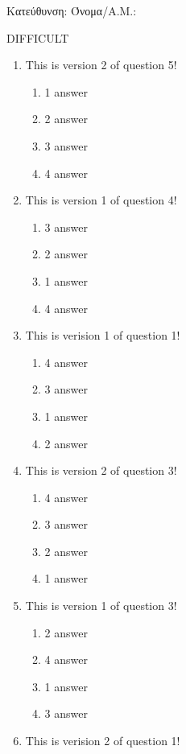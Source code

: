\documentclass[a4paper, 11pt]{article}
\begin{document}
{\flushleft Κατεύθυνση: }
{\flushleft Όνομα/Α.Μ.: }
\vspace*{0.5cm}
\begin{center} {\Large  DIFFICULT } \end{center}
\begin{enumerate}
\item This is version 2 of question 5!
\begin{enumerate}[(1)]
    \item 1 answer
    \item 2 answer
    \item 3 answer
    \item 4 answer
\end{enumerate}
\item This is version 1 of question 4!
\begin{enumerate}[(1)]
    \item 3 answer
    \item 2 answer
    \item 1 answer
    \item 4 answer
\end{enumerate}
\item This is verision 1 of question 1!
\begin{enumerate}[(1)]
    \item 4 answer
    \item 3 answer
    \item 1 answer
    \item 2 answer
\end{enumerate}
\item This is version 2 of question 3!
\begin{enumerate}[(1)]
    \item 4 answer
    \item 3 answer
    \item 2 answer
    \item 1 answer
\end{enumerate}
\item This is version 1 of question 3!
\begin{enumerate}[(1)]
    \item 2 answer
    \item 4 answer
    \item 1 answer
    \item 3 answer
\end{enumerate}
\item This is verision 2 of question 1!
\begin{enumerate}[(1)]

\end{enumerate}
\end{enumerate}
\end{document}
